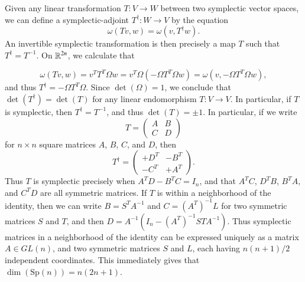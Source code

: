 Given any linear transformation $T: V \to W$ between two symplectic vector spaces, we can define a symplectic-adjoint $T^\dag: W \to V$ by the equation
%
\[ \omega(Tv,w) = \omega(v, T^\dag w). \]
%
An invertible symplectic transformation is then precisely a map $T$ such that $T^\dag = T^{-1}$. On $\operatorname{\mathbb{R}}^{2n}$, we calculate that

\[ \omega(Tv, w) = v^T T^T \Omega w = v^T \Omega (- \Omega T^T \Omega w) = \omega(v, - \Omega T^T \Omega w), \]
%
and thus $T^\dag = - \Omega T^T \Omega$. Since $\det(\Omega) = 1$, we conclude that $\det(T^\dag) = \det(T)$ for any linear endomorphism $T: V \to V$. In particular, if $T$ is symplectic, then $T^\dag = T^{-1}$, and thus $\det(T) = \pm 1$. In particular, if we write
%
\[ T = \begin{pmatrix} A & B \\ C & D \end{pmatrix} \]
%
for $n \times n$ square matrices $A$, $B$, $C$, and $D$, then
%
\[ T^\dag = \begin{pmatrix} +D^T & -B^T \\ - C^T & + A^T \end{pmatrix}. \]
%
Thus $T$ is symplectic precisely when $A^T D - B^T C = I_n$, and that $A^TC$, $D^T B$, $B^T A$, and $C^T D$ are all symmetric matrices. If $T$ is within a neighborhood of the identity, then we can write $B = S^T A^{-1}$ and $C = (A^T)^{-1} L$ for two symmetric matrices $S$ and $T$, and then $D = A^{-1}(I_n - (A^T)^{-1} ST A^{-1})$. Thus symplectic matrices in a neighborhood of the identity can be expressed uniquely as a matrix $A \in GL(n)$, and two symmetric matrices $S$ and $L$, each having $n(n+1)/2$ independent coordinates. This immediately gives that $\dim(\text{Sp}(n)) = n(2n+1)$.

